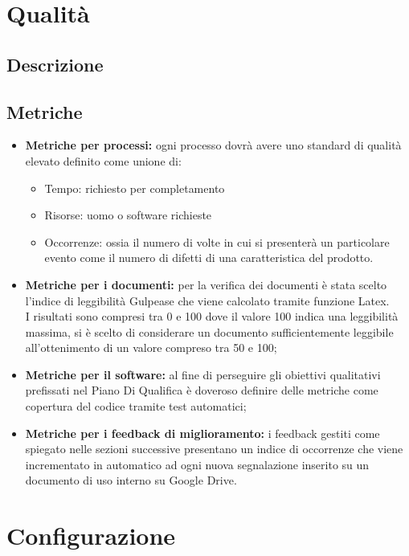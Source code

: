 \documentclass[NormeDiProgetto.tex]{subfiles}
\begin{document}
	\section{Qualità}
	\subsection{Descrizione}
	\subsection{Metriche}
	\begin{itemize}
		\item \textbf{Metriche per processi:} ogni processo dovrà avere uno standard di qualità elevato definito come unione di:
		\begin{itemize}
			\item Tempo: richiesto per completamento
			\item Risorse: uomo o software richieste
			\item Occorrenze: ossia il numero di volte in cui si presenterà un particolare evento come il numero di difetti di una caratteristica del prodotto.
		\end{itemize} 
		
		\item \textbf{Metriche per i documenti:} per la verifica dei documenti è stata scelto l'indice di leggibilità Gulpease che viene calcolato tramite funzione Latex.\\
		I risultati sono compresi tra 0 e 100 dove il valore 100 indica una leggibilità massima, si è scelto di considerare un documento sufficientemente leggibile all'ottenimento di un valore compreso tra 50 e 100; 
		
		\item \textbf{Metriche per il software:} al fine di perseguire gli obiettivi qualitativi prefissati nel Piano Di Qualifica è doveroso definire delle metriche come copertura del codice tramite test automatici;
		
		\item \textbf{Metriche per i feedback di miglioramento:} i feedback gestiti come spiegato nelle sezioni successive presentano un indice di occorrenze che viene incrementato in automatico ad ogni nuova segnalazione inserito su un documento di uso interno su Google Drive. 
	\end{itemize}

	
	\section{Configurazione}
	
\end{document}
